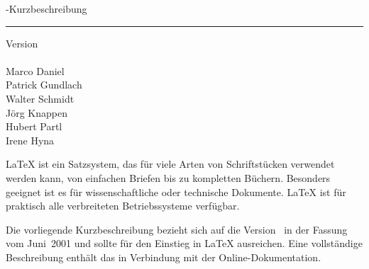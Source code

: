 
\begin{titlepage}
\renewcommand{\thefootnote}{\fnsymbol{footnote}}
{\Huge%
\selectfont
\raggedright
\sbLaTeXe-Kurzbeschreibung
\rule{\textwidth}{0.75pt}
\par
}
\begin{flushleft}
  \normalsize
  \selectfont
  Version \lkver\\
  \lkdate\\[2ex]
  Marco Daniel\\
  Patrick Gundlach\\
  Walter Schmidt\\
  Jörg Knappen\\
  Hubert Partl%
    \\
  Irene Hyna%
  \\
\end{flushleft}

\vfill

{\parindent=0cm
\LaTeX{} ist ein Satzsystem, das für viele Arten von
Schriftstücken verwendet werden kann, von einfachen Briefen bis zu
kompletten Büchern.  Besonders geeignet ist es für
wissenschaftliche oder technische Dokumente. \LaTeX{} ist für
praktisch alle verbreiteten Betriebssysteme verfügbar.
\bigskip

Die vorliegende Kurzbeschreibung bezieht sich auf die Version
\LaTeXe\ in der Fassung vom Juni~2001 und sollte für den
Einstieg in \LaTeX{} ausreichen.
Eine vollständige Beschreibung enthält das \manual{}
in Verbindung mit der Online-Dokumentation.
}
\setcounter{footnote}{0}
\end{titlepage}



